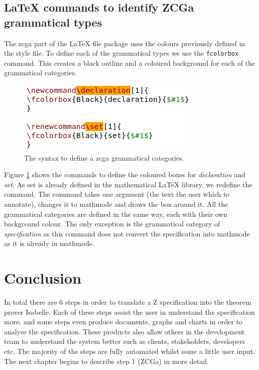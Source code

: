 \subsection{\LaTeX{} commands to identify ZCGa grammatical types}

The \gls{zcga} part of the \LaTeX{} file package uses the colours previously defined in the style file. To define each of the grammatical types we use the \texttt{fcolorbox} command. This creates a black outline and a coloured background for each of the grammatical categories.

\begin{figure}[H]
\includegraphics[scale=0.7]{Figures/Design/zmathe.png}
\caption{The syntax to define a \gls{zcga} grammatical categories. \label{fig:latexzcga}}
\end{figure}

Figure \ref{fig:latexzcga} shows the commands to define the coloured boxes for \emph{declaration} and \emph{set}. As set is already defined in the mathematical \LaTeX{} library, we redefine the command. The command takes one argument (the text the user which to annotate), changes it to mathmode and draws the box around it. All the grammatical categories are defined in the same way, each with their own background colour. The only exception is the grammatical category of \emph{specification} as this command does not convert the specification into mathmode as it is already in mathmode.

\section{Conclusion}

In total there are 6 steps in order to translate a Z specification into the theorem prover Isabelle. Each of these steps assist the user in understand the specification more, and some steps even produce documents, graphs and charts in order to analyse the specification. These products also allow others in the development team to understand the system better such as clients, stakeholders, developers etc. The majority of the steps are fully automated whilst some a little user input. The next chapter begins to describe step 1 (ZCGa) in more detail.